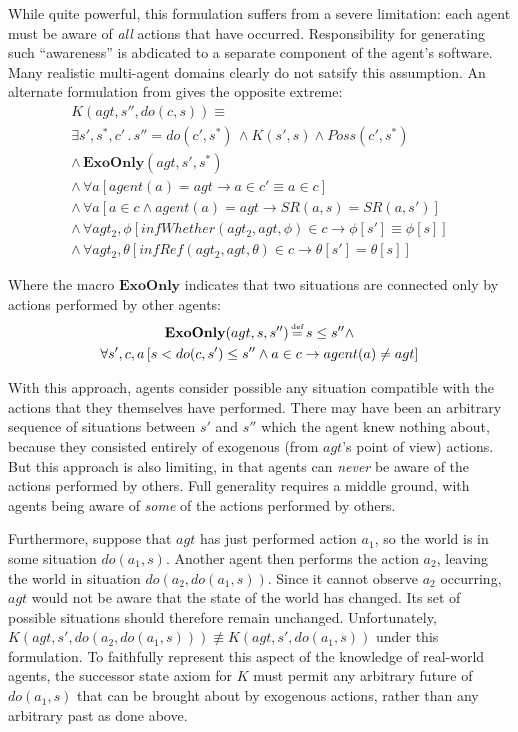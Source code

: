 \documentclass[letterpaper]{article}
\newcommand{\isdef}{\hbox{$\stackrel{\mbox{\tiny def}}{=}$}}
\begin{document}
While quite powerful, this formulation suffers from a severe limitation:
each agent must be aware of \emph{all} actions that have occurred.
Responsibility for generating such {}``awareness'' is abdicated
to a separate component of the agent's software. Many realistic multi-agent
domains clearly do not satsify this assumption. An alternate formulation
from \cite{Lesperance99sitcalc_approach} gives the opposite extreme:\begin{multline}
K(agt,s'',do(c,s))\equiv\\
\exists s',s^{*},c'\,.\, s''=do(c',s^{*})\,\wedge K(s',s)\wedge Poss(c',s^{*})\\
\wedge\,\mathbf{ExoOnly}(agt,s',s^{*})\\
\wedge\,\forall a\left[agent(a)=agt\rightarrow a\in c'\equiv a\in c\right]\\
\wedge\,\forall a\left[a\in c\wedge agent(a)=agt\rightarrow SR(a,s)=SR(a,s')\right]\\
\wedge\,\forall agt_{2},\phi\left[infWhether(agt_{2},agt,\phi)\in c\rightarrow\phi[s']\equiv\phi[s]\right]\\
\wedge\,\forall agt_{2},\theta\left[infRef(agt_{2},agt,\theta)\in c\rightarrow\theta[s']=\theta[s]\right]\label{eqn:k_ssa_exo}\end{multline}

Where the macro $\mathbf{ExoOnly}$ indicates that two situations
are connected only by actions performed by other agents:\begin{multline*}
\mathbf{ExoOnly}(agt,s,s'')\,\isdef\, s\leq s''\wedge\\
\forall s',c,a\left[s<do(c,s')\leq s''\wedge a\in c\rightarrow agent(a)\neq agt\right]\end{multline*}


With this approach, agents consider possible any situation compatible
with the actions that they themselves have performed. There may have
been an arbitrary sequence of situations between $s'$ and $s''$
which the agent knew nothing about, because they consisted entirely
of exogenous (from $agt$'s point of view) actions. But this approach
is also limiting, in that agents can \emph{never} be aware of the
actions performed by others. Full generality requires a middle ground,
with agents being aware of \emph{some} of the actions performed by
others.

Furthermore, suppose that $agt$ has just performed action $a_{1}$,
so the world is in some situation $do(a_{1},s)$. Another agent then
performs the action $a_{2}$, leaving the world in situation $do(a_{2},do(a_{1},s))$.
Since it cannot observe $a_{2}$ occurring, $agt$ would not be aware
that the state of the world has changed. Its set of possible situations
should therefore remain unchanged. Unfortunately, $K(agt,s',do(a_{2},do(a_{1},s)))\not\equiv K(agt,s',do(a_{1},s))$
under this formulation. To faithfully represent this aspect of the
knowledge of real-world agents, the successor state axiom for $K$
must permit any arbitrary future of $do(a_{1},s)$ that can be brought
about by exogenous actions, rather than any arbitrary past as done
above.
\end{document}

